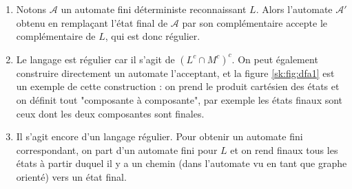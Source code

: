 \begin{sol}
\begin{enumerate}
\item Notons $\mathcal A$ un automate fini déterministe reconnaissant $L$. Alors l'automate $\mathcal A'$ obtenu en remplaçant l'état final de $\mathcal A$ par son complémentaire accepte le complémentaire de $L$, qui est donc régulier.
\item Le langage est régulier car il s'agit de $(L^c\cap M^c)^c$. On peut également construire directement un automate l'acceptant, et la figure \ref{sk:fig:dfa1} est un exemple de cette construction : on prend le produit cartésien des états et on définit tout "composante à composante", par exemple les états finaux sont ceux dont les deux composantes sont finales.
\item Il s'agit encore d'un langage régulier. Pour obtenir un automate fini correspondant, on part d'un automate fini pour $L$ et on rend finaux tous les états à partir duquel il y a un chemin (dans l'automate vu en tant que graphe orienté) vers un état final.
\end{enumerate}
\end{sol}

